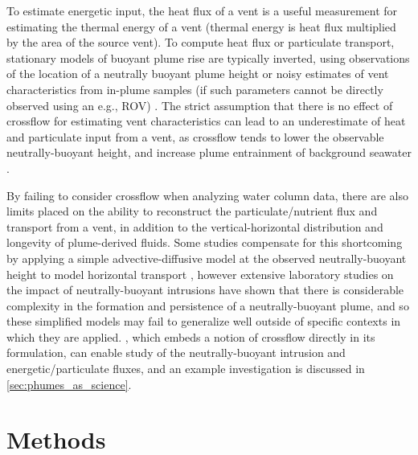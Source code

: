To estimate energetic input, the heat flux of a vent is a useful measurement for estimating the thermal energy of a vent (thermal energy is heat flux multiplied by the area of the source vent). To compute heat flux or particulate transport, stationary models of buoyant plume rise are typically inverted, using observations of the location of a neutrally buoyant plume height or noisy estimates of vent characteristics from in-plume samples (if such parameters cannot be directly observed using an e.g., ROV) \autocite{barreyre2012structure,barreyre2011dispersal,wilson1996hydrothermal,mittelstaedt2012quantifying,baker1993method,ramondenc2006first,murch2020volcaniclastic}. The strict assumption that there is no effect of crossflow for estimating vent characteristics can lead to an underestimate of heat and particulate input from a vent, as crossflow tends to lower the observable neutrally-buoyant height, and increase plume entrainment of background seawater \autocite{tohidi2016highly,adams2020turbulence}.

By failing to consider crossflow when analyzing water column data, there are also limits placed on the ability to reconstruct the particulate/nutrient flux and transport from a vent, in addition to the vertical-horizontal distribution and longevity of plume-derived fluids. Some studies compensate for this shortcoming by applying a simple advective-diffusive model at the observed neutrally-buoyant height to model horizontal transport \autocite{barreyre2011dispersal,murch2020volcaniclastic}, however extensive laboratory studies on the impact of neutrally-buoyant intrusions \autocite{richards2014radial} have shown that there is considerable complexity in the formation and persistence of a neutrally-buoyant plume, and so these simplified models may fail to generalize well outside of specific contexts in which they are applied. \PHUMES, which embeds a notion of crossflow directly in its formulation, can enable study of the neutrally-buoyant intrusion and energetic/particulate fluxes, and an example investigation is discussed in \cref{sec:phumes_as_science}. 


\section{Methods}
\label{sec:field_methods}


